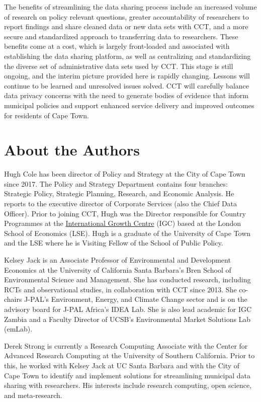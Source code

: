 \documentclass[
]{book}
\begin{document}
The benefits of streamlining the data sharing process include an increased volume of research on policy relevant questions, greater accountability of researchers to report findings and share cleaned data or new data sets with CCT, and a more secure and standardized approach to transferring data to researchers. These benefits come at a cost, which is largely front-loaded and associated with establishing the data sharing platform, as well as centralizing and standardizing the diverse set of administrative data sets used by CCT. This stage is still ongoing, and the interim picture provided here is rapidly changing. Lessons will continue to be learned and unresolved issues solved. CCT will carefully balance data privacy concerns with the need to generate bodies of evidence that inform municipal policies and support enhanced service delivery and improved outcomes for residents of Cape Town.

\hypertarget{about-the-authors-6}{%
\section*{About the Authors}\label{about-the-authors-6}}

Hugh Cole has been director of Policy and Strategy at the City of Cape Town since 2017. The Policy and Strategy Department contains four branches: Strategic Policy, Strategic Planning, Research, and Economic Analysis. He reports to the executive director of Corporate Services (also the Chief Data Officer). Prior to joining CCT, Hugh was the Director responsible for Country Programmes at the \href{http://www.theigc.org}{International Growth Centre} (IGC) based at the London School of Economics (LSE). Hugh is a graduate of the University of Cape Town and the LSE where he is Visiting Fellow of the School of Public Policy.

Kelsey Jack is an Associate Professor of Environmental and Development Economics at the University of California Santa Barbara's Bren School of Environmental Science and Management. She has conducted research, including RCTs and observational studies, in collaboration with CCT since 2013. She co-chairs J-PAL's Environment, Energy, and Climate Change sector and is on the advisory board for J-PAL Africa's IDEA Lab. She is also lead academic for IGC Zambia and a Faculty Director of UCSB's Environmental Market Solutions Lab (emLab).

Derek Strong is currently a Research Computing Associate with the Center for Advanced Research Computing at the University of Southern California. Prior to this, he worked with Kelsey Jack at UC Santa Barbara and with the City of Cape Town to identify and implement solutions for streamlining municipal data sharing with researchers. His interests include research computing, open science, and meta-research.
\end{document}
